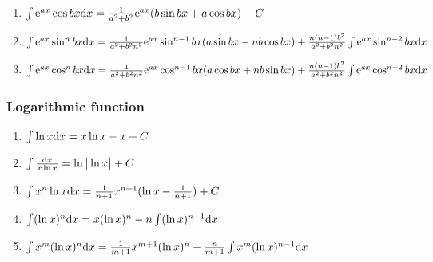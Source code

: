 \begin{tiny}
\begin{enumerate}[noitemsep]
\item $ \int \mathrm{e} ^{ax} \cos bx \mathrm{d} x = \frac{1}{a^2+b^2}\mathrm{e} ^{ax}(b \sin bx + a \cos bx)+C $

\item $ \int \mathrm{e} ^{ax} \sin ^ n bx \mathrm{d} x=\frac{1}{a^2+b^2 n^2}\mathrm{e} ^{ax} \sin ^ {n-1} bx (a \sin bx -nb \cos bx) +\frac{n(n-1)b^2}{a^2+b^2 n^2}\int \mathrm{e} ^{ax} \sin ^{n-2} bx \mathrm{d} x $

\item $ \int \mathrm{e} ^{ax} \cos ^ n bx \mathrm{d} x=\frac{1}{a^2+b^2 n^2}\mathrm{e} ^{ax} \cos ^ {n-1} bx (a \cos bx +nb \sin bx) +\frac{n(n-1)b^2}{a^2+b^2 n^2}\int \mathrm{e} ^{ax} \cos ^{n-2} bx \mathrm{d} x $

\end{enumerate}

\subsubsection{Logarithmic function}

\begin{enumerate}[noitemsep]

\item $ \int \ln x \mathrm{d} x = x \ln x - x + C$

\item $ \int \frac{\mathrm{d} x}{x \ln x} =\ln \big | \ln x \big |+C $

\item $ \int x^n \ln x \mathrm{d} x = \frac{1}{n+1}x^{n+1}(\ln x - \frac{1}{n+1} ) +C $

\item $ \int (\ln x)^{n} \mathrm{d} x = x(\ln x)^ n - n \int (\ln x)^{n-1} \mathrm{d} x $

\item $ \int x ^ m(\ln x)^n \mathrm{d} x=\frac{1}{m+1}x^{m+1} (\ln x)^n - \frac{n}{m+1} \int x^m(\ln x)^{n-1}\mathrm{d} x $ 

\end{enumerate}

\end{tiny}
